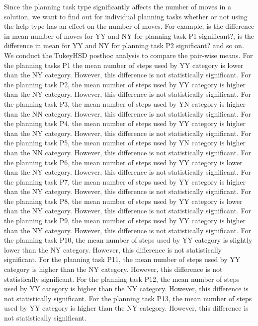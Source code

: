 Since the planning task type significantly affects the number of moves in a solution, we want to find out for individual planning tasks whether or not using the help type has an effect on the number of moves.
For example, is the difference in mean number of moves for YY and NY for planning task P1 significant?, is the difference in mean for YY and NY for planning task P2 significant? and so on.
We conduct the TukeyHSD posthoc analysis to compare the pair-wise means.
For the planning tasks P1 the mean number of steps used by YY category is lower than the NY category. However, this difference is not statistically significant.
For the planning task P2, the mean number of steps used by YY category is higher than the NY category. However, this difference is not statistically significant.
For the planning task P3, the mean number of steps used by YN category is higher than the NN category. However, this difference is not statistically significant.
For the planning task P4, the mean number of steps used by YY category is higher than the NY category. However, this difference is not statistically significant.
For the planning task P5, the mean number of steps used by YN category is higher than the NN category. However, this difference is not statistically significant.
For the planning task P6, the mean number of steps used by YY category is lower than the NY category. However, this difference is not statistically significant.
For the planning task P7, the mean number of steps used by YY category is higher than the NY category. However, this difference is not statistically significant.
For the planning task P8, the mean number of steps used by YY category is lower than the NY category. However, this difference is not statistically significant.
For the planning task P9, the mean number of steps used by YY category is higher than the NY category. However, this difference is not statistically significant.
For the planning task P10, the mean number of steps used by YY category is slightly lower than the NY category. However, this difference is not statistically significant.
For the planning task P11, the mean number of steps used by YY category is higher than the NY category. However, this difference is not statistically significant.
For the planning task P12, the mean number of steps used by YY category is higher than the NY category. However, this difference is not statistically significant.
For the planning task P13, the mean number of steps used by YY category is higher than the NY category. However, this difference is not statistically significant.


